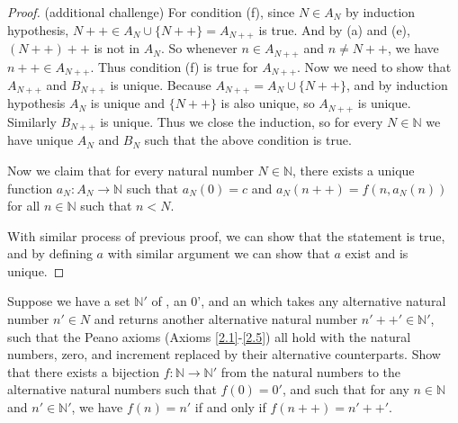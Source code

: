 \begin{proof}{(additional challenge)}
For condition (f), since \(N \in A_N\) by induction hypothesis, \(N++ \in A_N \cup \{N++\} = A_{N++}\) is true.
And by (a) and (e), \((N++)++\) is not in \(A_N\).
So whenever \(n \in A_{N++}\) and \(n \neq N++\), we have \(n++ \in A_{N++}\).
Thus condition (f) is true for \(A_{N++}\).
Now we need to show that \(A_{N++}\) and \(B_{N++}\) is unique.
Because \(A_{N++} = A_N \cup \{N++\}\), and by induction hypothesis \(A_N\) is unique and \(\{N++\}\) is also unique, so \(A_{N++}\) is unique.
Similarly \(B_{N++}\) is unique.
Thus we close the induction, so for every \(N \in \mathds{N}\) we have unique \(A_N\) and \(B_N\) such that the above condition is true.

Now we claim that for every natural number \(N \in \mathds{N}\), there exists a unique function \(a_N : A_N \to \mathds{N}\) such that \(a_N(0) = c\) and \(a_N(n++) = f(n, a_{N}(n))\) for all \(n \in \mathds{N}\) such that \(n < N\).

With similar process of previous proof, we can show that the statement is true, and by defining \(a\) with similar argument we can show that \(a\) exist and is unique.
\end{proof}

\begin{exercise}\label{ex 3.5.13}
Suppose we have a set \(\mathds{N}'\) of , an  0', and an  which takes any alternative natural number \(n' \in N\) and returns another alternative natural number \(n'++' \in \mathds{N}'\), such that the Peano axioms (Axioms \ref{2.1}-\ref{2.5}) all hold with the natural numbers, zero, and increment replaced by their alternative counterparts.
Show that there exists a bijection \(f : \mathds{N} \to \mathds{N}'\) from the natural numbers to the alternative natural numbers such that \(f(0) = 0'\), and such that for any \(n \in \mathds{N}\) and \(n' \in \mathds{N}'\), we have \(f(n) = n'\) if and only if \(f(n++) = n'++'\).
\end{exercise}

